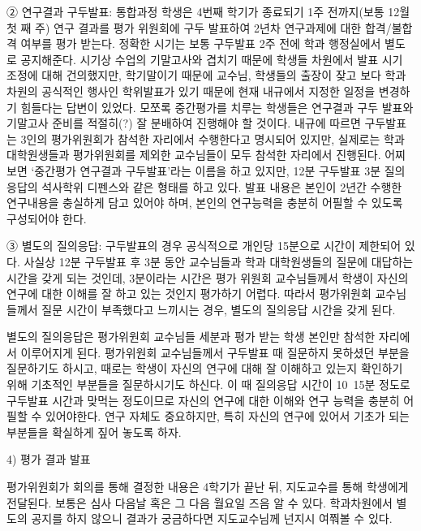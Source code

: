 ② 연구결과 구두발표: 통합과정 학생은 4번째 학기가 종료되기 1주 전까지(보통 12월
첫 째 주) 연구 결과를 평가 위원회에 구두 발표하여 2년차 연구과제에 대한
합격/불합격 여부를 평가 받는다.  정확한 시기는 보통 구두발표 2주 전에 학과
행정실에서 별도로 공지해준다.  시기상 수업의 기말고사와 겹치기 때문에 학생들
차원에서 발표 시기 조정에 대해 건의했지만, 학기말이기 때문에 교수님, 학생들의
출장이 잦고 보다 학과차원의 공식적인 행사인 학위발표가 있기 때문에 현재 내규에서
지정한 일정을 변경하기 힘들다는 답변이 있었다. 모쪼록 중간평가를 치루는 학생들은
연구결과 구두 발표와 기말고사 준비를 적절히(?) 잘 분배하여 진행해야 할 것이다.
내규에 따르면 구두발표는 3인의 평가위원회가 참석한 자리에서 수행한다고 명시되어
있지만, 실제로는 학과 대학원생들과 평가위원회를 제외한 교수님들이 모두 참석한
자리에서 진행된다.  어찌 보면 ‘중간평가 연구결과 구두발표’라는 이름을 하고
있지만, 12분 구두발표 3분 질의응답의 석사학위 디펜스와 같은 형태를 하고 있다.
발표 내용은 본인이 2년간 수행한 연구내용을 충실하게 담고 있어야 하며, 본인의
연구능력을 충분히 어필할 수 있도록 구성되어야 한다.

③ 별도의 질의응답: 구두발표의 경우 공식적으로 개인당 15분으로 시간이 제한되어
있다. 사실상 12분 구두발표 후 3분 동안 교수님들과 학과 대학원생들의 질문에
대답하는 시간을 갖게 되는 것인데, 3분이라는 시간은 평가 위원회 교수님들께서
학생이 자신의 연구에 대한 이해를 잘 하고 있는 것인지 평가하기 어렵다.  따라서
평가위원회 교수님들께서 질문 시간이 부족했다고 느끼시는 경우, 별도의 질의응답
시간을 갖게 된다.

별도의 질의응답은 평가위원회 교수님들 세분과 평가 받는 학생 본인만 참석한
자리에서 이루어지게 된다.  평가위원회 교수님들께서 구두발표 때 질문하지 못하셨던
부분을 질문하기도 하시고, 때로는 학생이 자신의 연구에 대해 잘 이해하고 있는지
확인하기 위해 기초적인 부분들을 질문하시기도 하신다.  이 때 질의응답 시간이
10~15분 정도로 구두발표 시간과 맞먹는 정도이므로 자신의 연구에 대한 이해와 연구
능력을 충분히 어필할 수 있어야한다.  연구 자체도 중요하지만, 특히 자신의 연구에
있어서 기초가 되는 부분들을 확실하게 짚어 놓도록 하자.

4) 평가 결과 발표

평가위원회가 회의를 통해 결정한 내용은 4학기가 끝난 뒤, 지도교수를 통해 학생에게
전달된다.  보통은 심사 다음날 혹은 그 다음 월요일 즈음 알 수 있다. 학과차원에서
별도의 공지를 하지 않으니 결과가 궁금하다면 지도교수님께 넌지시 여쭤볼 수 있다.

